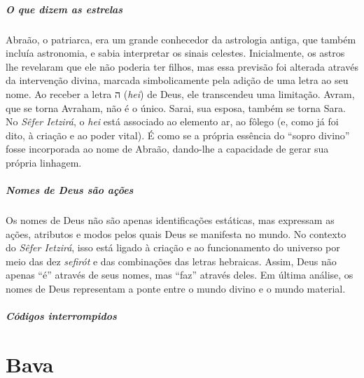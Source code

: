 \paragraph{O que dizem as estrelas} Abraão, o patriarca, era um grande conhecedor da astrologia antiga, que também incluía astronomia, e sabia interpretar os sinais celestes. Inicialmente, os astros lhe revelaram que ele não poderia ter filhos, mas essa previsão foi alterada através da intervenção divina, marcada simbolicamente pela adição de uma letra ao seu nome. Ao receber a letra {\frank ה} (\textit{hei}) de Deus, ele transcendeu uma limitação. Avram, que se torna Avraham, não é o único. Sarai, sua esposa, também se torna Sara. No \textit{Sêfer Ietzirá}, o \textit{hei} está associado ao elemento ar, ao fôlego (e, como já foi dito, à criação e ao poder vital). É como se a própria essência do ``sopro divino'' fosse incorporada ao nome de Abraão, dando-lhe a capacidade de gerar sua própria linhagem.

\paragraph{Nomes de Deus são ações} Os nomes de Deus não são apenas identificações estáticas, mas expressam as ações, atributos e modos pelos quais Deus se manifesta no mundo. No contexto do \textit{Sêfer Ietzirá}, isso está ligado à criação e ao funcionamento do universo por meio das dez \textit{sefirót} e das combinações das letras hebraicas. Assim, Deus não apenas ``é'' através de seus nomes, mas ``faz'' através deles. Em última análise, os nomes de Deus representam a ponte entre o mundo divino e o mundo material.  

\paragraph{Códigos interrompidos} 

\chapter*{Bava \smallskip{}}

